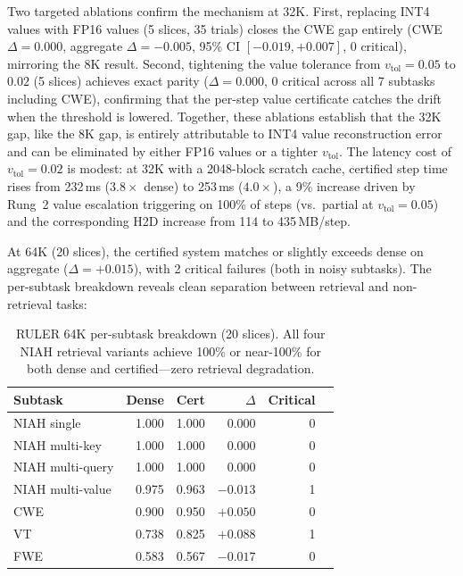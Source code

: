 \documentclass[11pt,a4paper]{article}
\theoremstyle{definition}
\theoremstyle{remark}
\begin{document}
Two targeted ablations confirm the mechanism at 32K\@.  First, replacing INT4 values with FP16 values (5 slices, 35 trials) closes the CWE gap entirely (CWE $\Delta{=}0.000$, aggregate $\Delta{=}{-}0.005$, 95\% CI $[-0.019, {+}0.007]$, 0 critical), mirroring the 8K result.  Second, tightening the value tolerance from $v_{\mathrm{tol}}{=}0.05$ to $0.02$ (5 slices) achieves exact parity ($\Delta{=}0.000$, 0 critical across all 7 subtasks including CWE), confirming that the per-step value certificate catches the drift when the threshold is lowered.  Together, these ablations establish that the 32K gap, like the 8K gap, is entirely attributable to INT4 value reconstruction error and can be eliminated by either FP16 values or a tighter $v_{\mathrm{tol}}$.  The latency cost of $v_{\mathrm{tol}}{=}0.02$ is modest: at 32K with a 2048-block scratch cache, certified step time rises from 232\,ms ($3.8\times$ dense) to 253\,ms ($4.0\times$), a 9\% increase driven by Rung~2 value escalation triggering on 100\% of steps (vs.\ partial at $v_{\mathrm{tol}}{=}0.05$) and the corresponding H2D increase from 114 to 435\,MB/step.

At 64K (20 slices), the certified system matches or slightly exceeds dense on aggregate ($\Delta{=}{+}0.015$), with 2 critical failures (both in noisy subtasks).  The per-subtask breakdown reveals clean separation between retrieval and non-retrieval tasks:

\begin{table}[H]
\centering
\caption{RULER 64K per-subtask breakdown (20 slices).  All four NIAH retrieval variants achieve 100\% or near-100\% for both dense and certified---zero retrieval degradation.}
\label{tab:ruler_subtask}
\small
\begin{tabular}{lrrrrr}
\toprule
\textbf{Subtask} & \textbf{Dense} & \textbf{Cert} & \textbf{$\Delta$} & \textbf{Critical} \\
\midrule
NIAH single      & 1.000 & 1.000 & $0.000$  & 0 \\
NIAH multi-key   & 1.000 & 1.000 & $0.000$  & 0 \\
NIAH multi-query & 1.000 & 1.000 & $0.000$  & 0 \\
NIAH multi-value & 0.975 & 0.963 & $-0.013$ & 1 \\
CWE              & 0.900 & 0.950 & $+0.050$ & 0 \\
VT               & 0.738 & 0.825 & $+0.088$ & 1 \\
FWE              & 0.583 & 0.567 & $-0.017$ & 0 \\
\bottomrule
\end{tabular}
\end{table}
\end{document}

